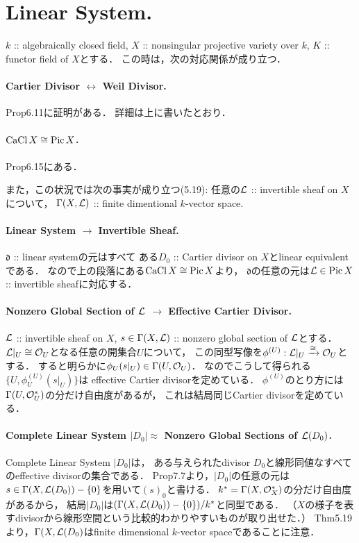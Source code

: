 \documentclass[a4paper]{jsarticle}
\newcommand{\CaCl}{\operatorname{CaCl}}
\newcommand{\Pic}{\operatorname{Pic}}
\newcommand{\lsd}{\mathfrak{d}}
\begin{document}
\section{Linear System.}
    $k$ :: algebraically closed field,
    $X$ :: nonsingular projective variety over $k$,
    $K$ :: functor field of $X$とする．
    この時は，次の対応関係が成り立つ．

    \paragraph{Cartier Divisor $\leftrightarrow$ Weil Divisor.}
    Prop6.11に証明がある．
    詳細は上に書いたとおり．

    \paragraph{$\CaCl X \iso \Pic X$.}
    Prop6.15にある．

    また，この状況では次の事実が成り立つ(5.19):
    任意の$\mathcal{L}$ :: invertible sheaf on $X$について，
    $\Gamma(X,\mathcal{L})$ :: finite dimentional $k$-vector space.

    \paragraph{Linear System $\rightarrow$ Invertible Sheaf.}
    $\lsd$ :: linear systemの元はすべて
    ある$D_0$ :: Cartier divisor on $X$とlinear equivalentである．
    なので上の段落にある$\CaCl X \iso \Pic X$より，
    $\lsd$の任意の元は$\shL \in \Pic X$ :: invertible sheafに対応する．

    \paragraph{Nonzero Global Section of $\mathcal{L}$ $\rightarrow$ Effective Cartier Divisor.}
    $\mathcal{L}$ :: invertible sheaf on $X$,
    $s \in \Gamma(X,\mathcal{L})$ :: nonzero global section of $\mathcal{L}$とする．
    $\mathcal{L}|_U \cong \mathcal{O}_U$となる任意の開集合$U$について，
    この同型写像を$\phi^{(U)}: \mathcal{L}|_U \xrightarrow{\cong} \mathcal{O}_U$とする．
    すると明らかに$\phi_U(s|_U) \in \Gamma(U,\mathcal{O}_U)$．
    なのでこうして得られる$\{U, \phi^{(U)}_U(s|_U)\}$は
    effective Cartier divisorを定めている．
    $\phi^{(U)}$のとり方には$\Gamma(U,\mathcal{O}_U^*)$の分だけ自由度があるが，
    これは結局同じCartier divisorを定めている．

    \paragraph{Complete Linear System $|D_0| $$\approx$ Nonzero Global Sections of $\mathcal{L}(D_0)$.}
    Complete Linear System $|D_0|$は，
    ある与えられたdivisor $D_0$と線形同値なすべてのeffective divisorの集合である．
    Prop7.7より，$|D_0|$の任意の元は$s \in \Gamma(X,\mathcal{L}(D_0))-\{0\}$を用いて$(s)_0$と書ける．
    $k^*=\Gamma(X,\mathcal{O}_X^*)$の分だけ自由度があるから，
    結局$|D_0|$は$(\Gamma(X,\mathcal{L}(D_0))-\{0\})/k^*$と同型である．
    （$X$の様子を表すdivisorから線形空間という比較的わかりやすいものが取り出せた．）
    Thm5.19より，$\Gamma(X,\mathcal{L}(D_0)$はfinite dimensional $k$-vector spaceであることに注意．
\end{document}
